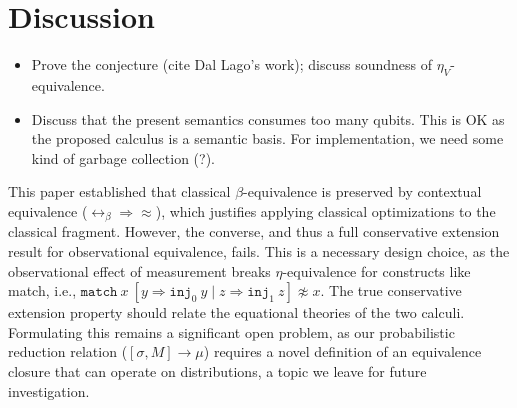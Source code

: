 \section{Discussion}

\begin{itemize}
\item Prove the conjecture (cite Dal Lago's work); discuss soundness of $\eta_V$-equivalence.
\item Discuss that the present semantics consumes too many qubits.
  This is OK as the proposed calculus is a semantic basis.  For
  implementation, we need some kind of garbage collection (?).
\end{itemize}

This paper established that classical $\beta$-equivalence is preserved by contextual equivalence ($\leftrightarrow_\beta \Rightarrow \approx$), which justifies applying classical optimizations to the classical fragment.
However, the converse, and thus a full conservative extension result for observational equivalence, fails.
This is a necessary design choice, as the observational effect of measurement breaks $\eta$-equivalence for constructs like match, i.e., $\texttt{match}\ x\ [y\Rightarrow \texttt{inj}_0\ y\mid z\Rightarrow \texttt{inj}_1\ z] \not\approx x$.
The true conservative extension property should relate the equational theories of the two calculi.
Formulating this remains a significant open problem, as our probabilistic reduction relation ($[\sigma, M] \longrightarrow \mu$) requires a novel definition of an equivalence closure that can operate on distributions, a topic we leave for future investigation.


